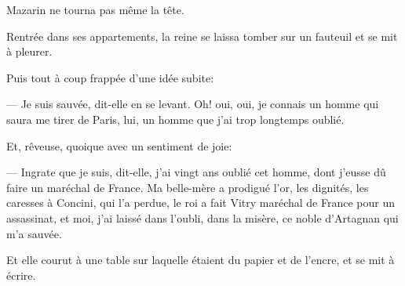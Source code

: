 Mazarin ne tourna pas même la tête.

Rentrée dans ses appartements, la reine se laissa tomber sur un fauteuil et se mit à pleurer.

Puis tout à coup frappée d'une idée subite:

— Je suis sauvée, dit-elle en se levant. Oh! oui, oui, je connais un homme qui saura me tirer de Paris, lui, un homme que j'ai trop longtemps oublié.

Et, rêveuse, quoique avec un sentiment de joie:

— Ingrate que je suis, dit-elle, j'ai vingt ans oublié cet homme, dont j'eusse dû faire un maréchal de France. Ma belle-mère a prodigué l'or, les dignités, les caresses à Concini, qui l'a perdue, le roi a fait Vitry maréchal de France pour un assassinat, et moi, j'ai laissé dans l'oubli, dans la misère, ce noble d'Artagnan qui m'a sauvée.

Et elle courut à une table sur laquelle étaient du papier et de l'encre, et se mit à écrire.
